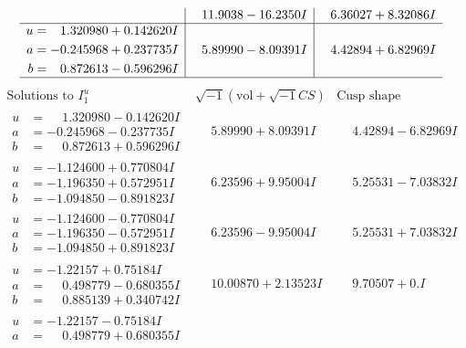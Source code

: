 \documentclass[1p]{elsarticle_modified}
\theoremstyle{definition}
\newcommand{\I}{\sqrt{-1}}
\begin{document}
$$\begin{array}{c|c|c}
 & \phantom{-}11.9038 - 16.2350 I & \phantom{-}6.36027 + 8.32086 I \\ \hline\begin{aligned}
u &= \phantom{-}1.320980 + 0.142620 I \\
a &= -0.245968 + 0.237735 I \\
b &= \phantom{-}0.872613 - 0.596296 I\end{aligned}
 & \phantom{-}5.89990 - 8.09391 I & \phantom{-}4.42894 + 6.82969 I\\
 \hline 
 \end{array}$$\newpage$$\begin{array}{c|c|c}  
\text{Solutions to }I^u_{1}& \I (\text{vol} + \sqrt{-1}CS) & \text{Cusp shape}\\
 \hline 
\begin{aligned}
u &= \phantom{-}1.320980 - 0.142620 I \\
a &= -0.245968 - 0.237735 I \\
b &= \phantom{-}0.872613 + 0.596296 I\end{aligned}
 & \phantom{-}5.89990 + 8.09391 I & \phantom{-}4.42894 - 6.82969 I \\ \hline\begin{aligned}
u &= -1.124600 + 0.770804 I \\
a &= -1.196350 + 0.572951 I \\
b &= -1.094850 - 0.891823 I\end{aligned}
 & \phantom{-}6.23596 + 9.95004 I & \phantom{-}5.25531 - 7.03832 I \\ \hline\begin{aligned}
u &= -1.124600 - 0.770804 I \\
a &= -1.196350 - 0.572951 I \\
b &= -1.094850 + 0.891823 I\end{aligned}
 & \phantom{-}6.23596 - 9.95004 I & \phantom{-}5.25531 + 7.03832 I \\ \hline\begin{aligned}
u &= -1.22157 + 0.75184 I \\
a &= \phantom{-}0.498779 - 0.680355 I \\
b &= \phantom{-}0.885139 + 0.340742 I\end{aligned}
 & \phantom{-}10.00870 + 2.13523 I & \phantom{-}9.70507 + 0. I\phantom{ +0.000000I} \\ \hline\begin{aligned}
u &= -1.22157 - 0.75184 I \\
a &= \phantom{-}0.498779 + 0.680355 I \\

\end{aligned}
\end{array}$$
\end{document}
